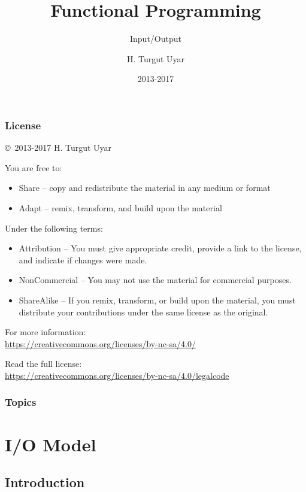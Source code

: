 \documentclass[dvipsnames]{beamer}
\title{Functional Programming}
\subtitle{Input/Output}
\author{H. Turgut Uyar}
\date{2013-2017}
\theoremstyle{plain}
\begin{document}
\begin{frame}
  \titlepage
\end{frame}

\begin{frame}
  \frametitle{License}

  \hfill
  \copyright~2013-2017 H. Turgut Uyar

  \vfill
  \begin{footnotesize}
    You are free to:
    \begin{itemize}
      \itemsep0em
      \item Share -- copy and redistribute the material in any medium or format
      \item Adapt -- remix, transform, and build upon the material
    \end{itemize}

    Under the following terms:
    \begin{itemize}
      \itemsep0em
      \item Attribution -- You must give appropriate credit, provide a link to
        the license, and indicate if changes were made.

      \item NonCommercial -- You may not use the material for commercial
        purposes.

      \item ShareAlike -- If you remix, transform, or build upon the material,
        you must distribute your contributions under the same license as the
        original.
    \end{itemize}

    For more information:\\
    \url{https://creativecommons.org/licenses/by-nc-sa/4.0/}

    \smallskip
    Read the full license:\\
    \url{https://creativecommons.org/licenses/by-nc-sa/4.0/legalcode}
  \end{footnotesize}
\end{frame}

\begin{frame}
  \frametitle{Topics}
  \tableofcontents
\end{frame}

\section{I/O Model}

\subsection{Introduction}
\end{document}
